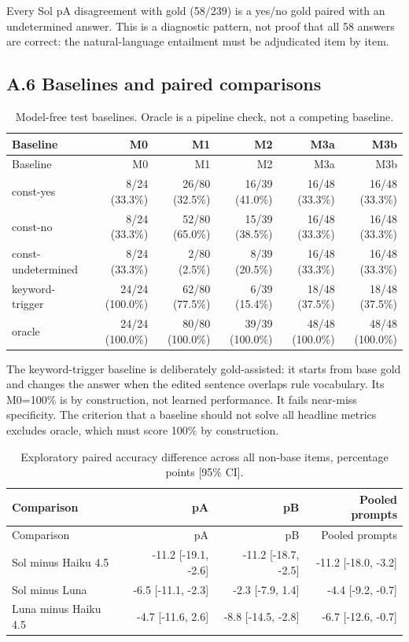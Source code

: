 Every Sol pA disagreement with gold (58/239) is a yes/no gold paired with an undetermined answer. This is a diagnostic pattern, not proof that all 58 answers are correct: the natural-language entailment must be adjudicated item by item.

\subsection*{A.6 Baselines and paired comparisons}

\begingroup\small\setlength{\tabcolsep}{4pt}
\begin{longtable}{lrrrrr}
\caption{Model-free test baselines. Oracle is a pipeline check, not a competing baseline.}\\
\toprule
Baseline & M0 & M1 & M2 & M3a & M3b \\
\midrule\endfirsthead
\toprule
Baseline & M0 & M1 & M2 & M3a & M3b \\
\midrule\endhead
\bottomrule\endfoot
const-yes & 8/24 (33.3\%) & 26/80 (32.5\%) & 16/39 (41.0\%) & 16/48 (33.3\%) & 16/48 (33.3\%) \\
const-no & 8/24 (33.3\%) & 52/80 (65.0\%) & 15/39 (38.5\%) & 16/48 (33.3\%) & 16/48 (33.3\%) \\
const-undetermined & 8/24 (33.3\%) & 2/80 (2.5\%) & 8/39 (20.5\%) & 16/48 (33.3\%) & 16/48 (33.3\%) \\
keyword-trigger & 24/24 (100.0\%) & 62/80 (77.5\%) & 6/39 (15.4\%) & 18/48 (37.5\%) & 18/48 (37.5\%) \\
oracle & 24/24 (100.0\%) & 80/80 (100.0\%) & 39/39 (100.0\%) & 48/48 (100.0\%) & 48/48 (100.0\%) \\
\end{longtable}\endgroup


The keyword-trigger baseline is deliberately gold-assisted: it starts from base gold and changes the answer when the edited sentence overlaps rule vocabulary. Its M0=100\% is by construction, not learned performance. It fails near-miss specificity. The criterion that a baseline should not solve all headline metrics excludes oracle, which must score 100\% by construction.

\begingroup\small\setlength{\tabcolsep}{4pt}
\begin{longtable}{lrrr}
\caption{Exploratory paired accuracy difference across all non-base items, percentage points [95\% CI].}\\
\toprule
Comparison & pA & pB & Pooled prompts \\
\midrule\endfirsthead
\toprule
Comparison & pA & pB & Pooled prompts \\
\midrule\endhead
\bottomrule\endfoot
Sol minus Haiku 4.5 & -11.2 [-19.1, -2.6] & -11.2 [-18.7, -2.5] & -11.2 [-18.0, -3.2] \\
Sol minus Luna & -6.5 [-11.1, -2.3] & -2.3 [-7.9, 1.4] & -4.4 [-9.2, -0.7] \\
Luna minus Haiku 4.5 & -4.7 [-11.6, 2.6] & -8.8 [-14.5, -2.8] & -6.7 [-12.6, -0.7] \\
\end{longtable}\endgroup


